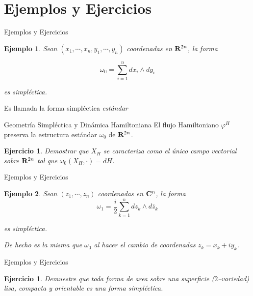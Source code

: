 \documentclass{beamer}
\newcounter{Ejercicio}
\newtheorem{Ejercicio}[theorem]{Ejercicio}%
\newtheorem{Ejemplo}{Ejemplo}
\def\R\re
\def \R{{\bf R}}
\def \re{{\mathbb R}}
\def \C{{\bf C}}
\begin{document}
\section{Ejemplos y Ejercicios}
\begin{frame}{Ejemplos y Ejercicios}

\begin{Ejemplo}
Sean $(x_1, \cdots, x_{n}, y_1, \cdots , y_{n})$ coordenadas en $\R^{2n}$, la forma  

$$\omega_0=\sum\limits_{i=1}^{n}dx_{i}\wedge dy_{i}$$

es simpl\'ectica.
\end{Ejemplo}
\pause

 Es llamada la forma simpl\'ectica \emph{est\'andar}

\end{frame}

\begin{frame}{Geometría Simpléctica y Dinámica Hamiltoniana}
El flujo Hamiltoniano $\varphi^{H}$ preserva la estructura est\'andar $\omega_0$ de $\R^{2n}$.
\vfill

\pause

\begin{Ejercicio}\label{contr-anula}
 Demostrar que $X_{H}$ se caracteriza como el \'unico campo vectorial sobre $\R^{2n}$ tal que $\omega_0(X_{H}, \cdot)=dH$.
\end{Ejercicio}

\end{frame}


\begin{frame}{Ejemplos y Ejercicios}


\begin{Ejemplo}
Sean $(z_1, \cdots , z_{n})$ coordenadas en $\C^{n}$, la forma 
$$\omega_1=\frac{i}{2} \sum\limits_{k=1}^{n}dz_{k}\wedge d\bar{z}_{k}$$

es simpl\'ectica.

\vfill
       
\pause

 De hecho es la misma que $\omega_0$ al hacer el cambio de coordenadas $z_{k}=x_{k}+iy_{k}$.
\end{Ejemplo}


\end{frame}


\begin{frame}{Ejemplos y Ejercicios}

\begin{Ejercicio}
Demuestre que toda forma de area sobre una superficie ($2$--variedad) lisa, compacta y orientable es una forma simpl\'ectica. 
\end{Ejercicio}

\end{frame}
\end{document}
